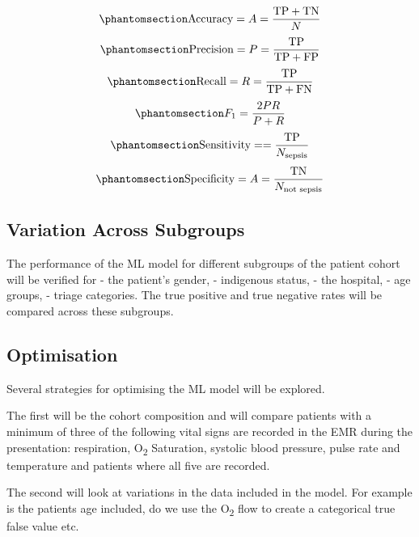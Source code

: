 \documentclass[
  a4paper,
  ,captions=tableheading
]{scrartcl}
\begin{document}
\begin{equation}\protect\phantomsection\label{eq:accuracy}{\text{Accuracy} = A = \frac{\text{TP} +\text{TN}}{N}}\end{equation}
\begin{equation}\protect\phantomsection\label{eq:precision}{\text{Precision} = P = \frac{\text{TP}}{\text{TP} + \text{FP}}}\end{equation}
\begin{equation}\protect\phantomsection\label{eq:recall}{\text{Recall} = R = \frac{\text{TP}}{\text{TP} + \text{FN}}}\end{equation}
\begin{equation}\protect\phantomsection\label{eq:f1}{F_{1} = \frac{2 P R}{P+R}}\end{equation}
\begin{equation}\protect\phantomsection\label{eq:sensitivity}{\text{Sensitivity} =  = \frac{\text{TP}}{N_{\text{sepsis}}}}\end{equation}
\begin{equation}\protect\phantomsection\label{eq:specificity}{\text{Specificity} = A = \frac{\text{TN}}{N_{\text{not sepsis}}}}\end{equation}

\subsection{Variation Across
Subgroups}\label{variation-across-subgroups}

The performance of the ML model for different subgroups of the patient
cohort will be verified for - the patient's gender, - indigenous status,
- the hospital, - age groups, - triage categories. The true positive and
true negative rates will be compared across these subgroups.

\subsection{Optimisation}\label{optimisation}

Several strategies for optimising the ML model will be explored.

The first will be the cohort composition and will compare patients with
a minimum of three of the following vital signs are recorded in the EMR
during the presentation: respiration, O\textsubscript{2} Saturation,
systolic blood pressure, pulse rate and temperature and patients where
all five are recorded.

The second will look at variations in the data included in the model.
For example is the patients age included, do we use the
O\textsubscript{2} flow to create a categorical true false value etc.
\end{document}
